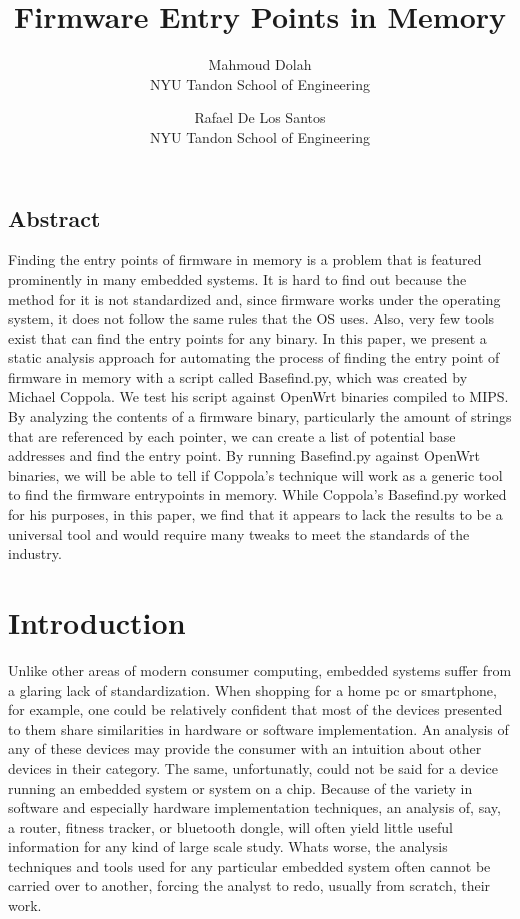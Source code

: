 \documentclass[letterpaper,twocolumn,10pt]{article}
\begin{document}
\title{\Large \bf Firmware Entry Points in Memory}
\author{
    {\rm Mahmoud Dolah}\\
    NYU Tandon School of Engineering
    \and
    {\rm Rafael De Los Santos}\\
    NYU Tandon School of Engineering
}

\date{}

\maketitle

\thispagestyle{empty}

\subsection*{Abstract}
Finding the entry points of firmware in memory is a problem that is featured prominently in many embedded systems. It is hard to find out because the method for it is not standardized and, since firmware works under the operating system, it does not follow the same rules that the OS uses. Also, very few tools exist that can find the entry points for any binary. In this paper, we present a static analysis approach for automating the process of finding the entry point of firmware in memory with a script called Basefind.py, which was created by Michael Coppola. We test his script against OpenWrt binaries compiled to MIPS. By analyzing the contents of a firmware binary, particularly the amount of strings that are referenced by each pointer, we can create a list of potential base addresses and find the entry point. By running Basefind.py against OpenWrt binaries, we will be able to tell if Coppola's technique will work as a generic tool to find the firmware entrypoints in memory. While Coppola's Basefind.py worked for his purposes, in this paper, we find that it appears to lack the results to be a universal tool and would require many tweaks to meet the standards of the industry. 

\section{Introduction}
Unlike other areas of modern consumer computing, embedded systems suffer from a glaring lack of standardization. When shopping for a home pc or smartphone, for example, one could be relatively confident that most of the devices presented to them share similarities in hardware or software implementation. An analysis of any of these devices may provide the consumer with an intuition about other devices in their category. The same, unfortunatly, could not be said for a device running an embedded system or system on a chip. Because of the variety in software and especially hardware implementation techniques, an analysis of, say, a router, fitness tracker, or bluetooth dongle, will often yield little useful information for any kind of large scale study. Whats worse, the analysis techniques and tools used for any particular embedded system often cannot be carried over to another, forcing the analyst to redo, usually from scratch, their work.
\end{document}
